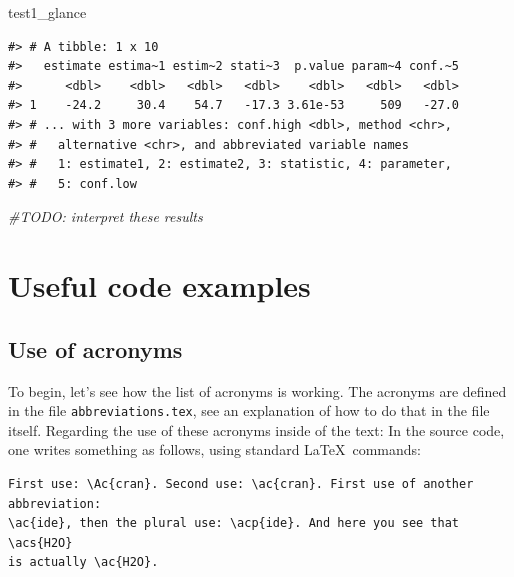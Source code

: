 \documentclass[
  11pt,
  a4paper,
  twoside]{scrbook}
\newenvironment{Shaded}{\begin{snugshade}}{\end{snugshade}}
\newcommand{\CommentTok}[1]{\textcolor[rgb]{0.56,0.35,0.01}{\textit{#1}}}
\newcommand{\NormalTok}[1]{#1}
\begin{document}
\linespread{1}

\begin{Shaded}
\begin{Highlighting}[]
\NormalTok{test1\_glance}
\end{Highlighting}
\end{Shaded}

\linespread{1}

\begin{verbatim}
#> # A tibble: 1 x 10
#>   estimate estima~1 estim~2 stati~3  p.value param~4 conf.~5
#>      <dbl>    <dbl>   <dbl>   <dbl>    <dbl>   <dbl>   <dbl>
#> 1    -24.2     30.4    54.7   -17.3 3.61e-53     509   -27.0
#> # ... with 3 more variables: conf.high <dbl>, method <chr>,
#> #   alternative <chr>, and abbreviated variable names
#> #   1: estimate1, 2: estimate2, 3: statistic, 4: parameter,
#> #   5: conf.low
\end{verbatim}

\linespread{1}

\begin{Shaded}
\begin{Highlighting}[]

\CommentTok{\#TODO: interpret these results}
\end{Highlighting}
\end{Shaded}

\linespread{1}

\hypertarget{appendix-appendix}{%
\appendix}


\hypertarget{useful-code-examples}{%
\chapter{Useful code examples}\label{useful-code-examples}}

\hypertarget{use-of-acronyms}{%
\section{Use of acronyms}\label{use-of-acronyms}}

To begin, let's see how the list of acronyms is working. The acronyms are defined in the file \texttt{abbreviations.tex}, see an explanation of how to do that in the file itself. Regarding the use of these acronyms inside of the text: In the source code, one writes something as follows, using standard \LaTeX~commands:

\begin{verbatim}
First use: \Ac{cran}. Second use: \ac{cran}. First use of another abbreviation: 
\ac{ide}, then the plural use: \acp{ide}. And here you see that \acs{H2O} 
is actually \ac{H2O}.
\end{verbatim}
\end{document}
